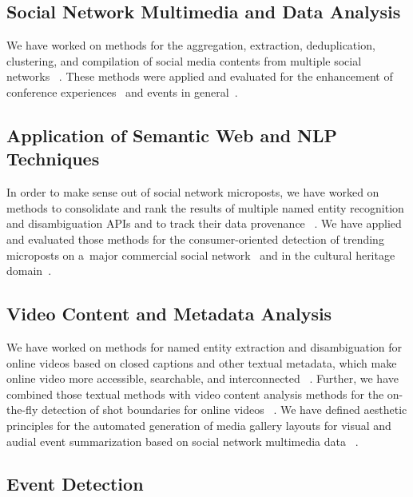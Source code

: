 \subsection{Social Network Multimedia and Data Analysis}

We have worked on methods for the aggregation, extraction,
deduplication, clustering, and compilation
of social media contents from
multiple social networks~%
\cite{rizzo2012whatfresh}.
These methods were applied and evaluated
for the enhancement of conference experiences~%
\cite{khrouf2012aggregatingsocialmedia,khrouf2012confomaton}
and events in general~\cite{steiner2013crop,steiner2013meteoroid,steiner2013nearduplicate,steiner2013vhsrecording,steiner2014clustering,milicic2013live}.

\subsection{Application of Semantic Web and NLP Techniques}

In order to make sense out of social network microposts,
we have worked on methods to consolidate and rank
the results of multiple named entity recognition and
disambiguation APIs and to track their data provenance~%
\cite{steiner2011addingmeaning,steiner2013addingmeaning}.
We have applied and evaluated those methods
for the consumer-oriented detection of trending microposts
on a~major commercial social network~%
\cite{steiner2011tweetconsumers} and in the cultural heritage domain~\cite{van2013named}.

\subsection{Video Content and Metadata Analysis}

We have worked on methods for named entity extraction and
disambiguation for online videos based on closed captions
and other textual metadata, which make online video
more accessible, searchable, and interconnected~%
\cite{steiner2010semwebvid,steiner2010semwebvidchallenge}.
Further, we have combined those textual methods with
video content analysis methods for the on-the-fly detection
of shot boundaries for online videos~%
\cite{steiner2012shotdetection}.
We have defined aesthetic principles
for the automated generation of media gallery layouts
for visual and audial event summarization
based on social network multimedia data~%
\cite{steiner2012definingaesthetic}.

\subsection{Event Detection}

